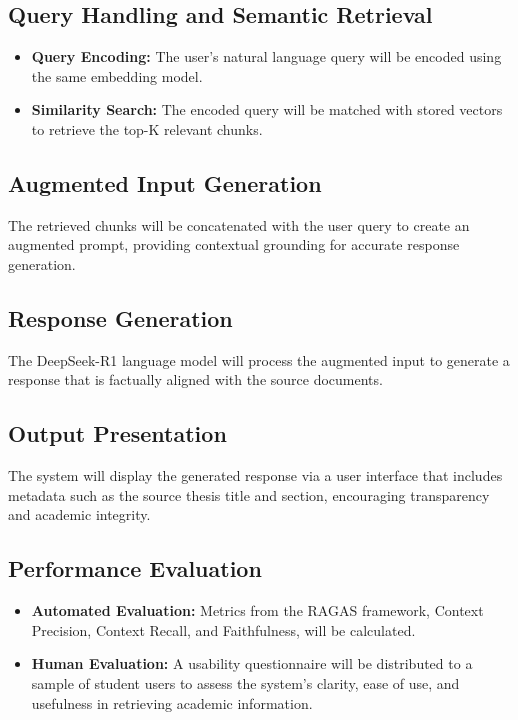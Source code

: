 \begin{refsection}
\subsection*{Query Handling and Semantic Retrieval}
\begin{itemize}
    \item \textbf{Query Encoding:} The user’s natural language query will be encoded using the same embedding model.
    \item \textbf{Similarity Search:} The encoded query will be matched with stored vectors to retrieve the top-K relevant chunks.
\end{itemize}

\subsection*{Augmented Input Generation}
The retrieved chunks will be concatenated with the user query to create an augmented prompt, providing contextual grounding for accurate response generation.

\subsection*{Response Generation}
The DeepSeek-R1 language model will process the augmented input to generate a response that is factually aligned with the source documents.

\subsection*{Output Presentation}
The system will display the generated response via a user interface that includes metadata such as the source thesis title and section, encouraging transparency and academic integrity.

\subsection*{Performance Evaluation}
\begin{itemize}
    \item \textbf{Automated Evaluation:} Metrics from the RAGAS framework, Context Precision, Context Recall, and Faithfulness, will be calculated.
    \item \textbf{Human Evaluation:} A usability questionnaire will be distributed to a sample of student users to assess the system’s clarity, ease of use, and usefulness in retrieving academic information.
\end{itemize}


\end{refsection}
